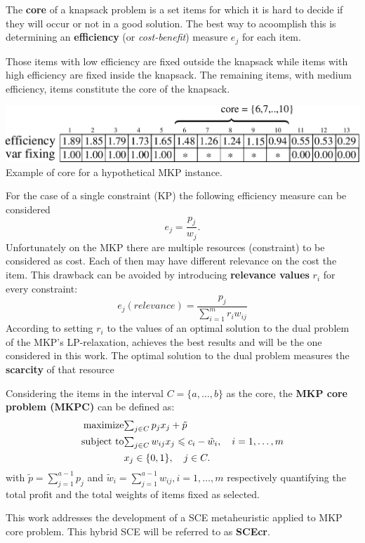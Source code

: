 The {\bf core} of a knapsack problem is a set items for which it is hard to decide
if they will occur or not in a good solution.
The best way to acoomplish this is determining an {\bf efficiency} (or {\it cost-benefit}) measure $e_j$ for each item.

Those items with low efficiency are fixed outside the knapsack while items with high
efficiency are fixed inside the knapsack.
The remaining items, with medium efficiency, items constitute the core of the knapsack.
\vspace{-9pt}
\begin{center}
  \includegraphics[scale=0.38]{imgs/efficiency} \\
  {\small Example of core for a hypothetical MKP instance.}
\end{center}
For the case of a single constraint (KP) the following efficiency measure can
be considered \vspace{-5pt}
\begin{displaymath}
  e_j = \frac{p_j}{w_j}.
\end{displaymath}
Unfortunately on the MKP there are multiple resources (constraint) to be considered as cost.
Each of then may have different relevance on the cost the item.
This drawback can be avoided by introducing {\bf relevance values} $r_i$
for every constraint:
\begin{displaymath}
  e_j(relevance) = \frac{p_j}{\sum_{i=1}^{m} r_i w_{ij}}
\end{displaymath}
According to \cite{puchinger2006core} setting $r_i$ to the values
of an optimal solution to the dual problem of the MKP's
LP-relaxation, achieves the best results and will be the one
considered in this work.
The optimal solution to the dual problem measures the {\bf scarcity} of that resource

Considering the items in the interval $C = \{ a, \ldots, b \}$ as the core,
the {\bf MKP core problem (MKPC)} can be defined as:
\begin{align}
    \text{maximize} & {\textstyle \sum_{j \in C} p_j x_j  + \tilde{p}}\\
    \text{subject to} & {\textstyle \sum_{j \in C} w_{ij} x_j \leqslant c_i - \tilde{w}_i, \quad i = 1, \ldots, m}\\
  & x_j \in \{0, 1\}, \quad j \in C.
\end{align}
with $\tilde{p} = \sum^{a-1}_{j=1} p_j$  and $\tilde{w}_i = \sum^{a-1}_{j=1} w_{ij}, i = 1, \ldots, m$
respectively quantifying the total profit and the total weights of items fixed as selected.

This work addresses the development of a SCE metaheuristic applied to MKP core problem.
This hybrid SCE will be referred to as {\bf SCEcr}.

